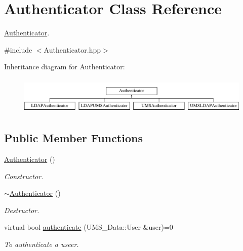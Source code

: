 \hypertarget{classAuthenticator}{
\section{Authenticator Class Reference}
\label{classAuthenticator}
}


\hyperlink{classAuthenticator}{Authenticator}.  




{\ttfamily \#include $<$Authenticator.hpp$>$}

Inheritance diagram for Authenticator:\begin{figure}[H]
\begin{center}
\leavevmode
\includegraphics[height=1.806452cm]{classAuthenticator}
\end{center}
\end{figure}
\subsection*{Public Member Functions}
\begin{DoxyCompactItemize}
\item 
\hypertarget{classAuthenticator_a50f5410cc0fb998ea4dbac9535e34e31}{
\hyperlink{classAuthenticator_a50f5410cc0fb998ea4dbac9535e34e31}{Authenticator} ()}
\label{classAuthenticator_a50f5410cc0fb998ea4dbac9535e34e31}

\begin{DoxyCompactList}\small\item\em Constructor. \item\end{DoxyCompactList}\item 
\hypertarget{classAuthenticator_a263931592546d936a91dcd891a1977a7}{
\hyperlink{classAuthenticator_a263931592546d936a91dcd891a1977a7}{$\sim$Authenticator} ()}
\label{classAuthenticator_a263931592546d936a91dcd891a1977a7}

\begin{DoxyCompactList}\small\item\em Destructor. \item\end{DoxyCompactList}\item 
virtual bool \hyperlink{classAuthenticator_a22049b3d6a700ac8d40190366a75bc22}{authenticate} (UMS\_\-Data::User \&user)=0
\begin{DoxyCompactList}\small\item\em To authenticate a useer. \item\end{DoxyCompactList}\end{DoxyCompactItemize}


